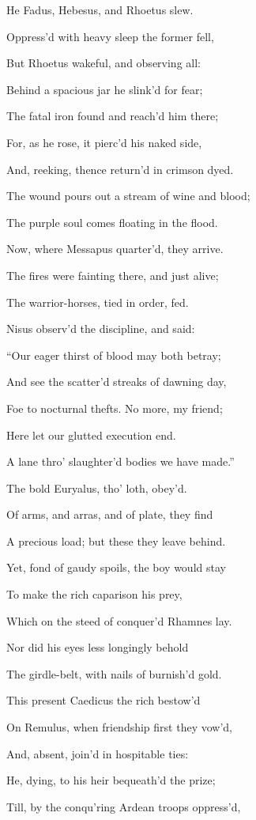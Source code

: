 He Fadus, Hebesus, and Rhoetus slew.

Oppress’d with heavy sleep the former fell,

But Rhoetus wakeful, and observing all:

Behind a spacious jar he slink’d for fear;

The fatal iron found and reach’d him there;

For, as he rose, it pierc’d his naked side,

And, reeking, thence return’d in crimson dyed.

The wound pours out a stream of wine and blood;

The purple soul comes floating in the flood.

Now, where Messapus quarter’d, they arrive.

The fires were fainting there, and just alive;

The warrior-horses, tied in order, fed.

Nisus observ’d the discipline, and said:

“Our eager thirst of blood may both betray;

And see the scatter’d streaks of dawning day,

Foe to nocturnal thefts. No more, my friend;

Here let our glutted execution end.

A lane thro’ slaughter’d bodies we have made.”

The bold Euryalus, tho’ loth, obey’d.

Of arms, and arras, and of plate, they find

A precious load; but these they leave behind.

Yet, fond of gaudy spoils, the boy would stay

To make the rich caparison his prey,

Which on the steed of conquer’d Rhamnes lay.

Nor did his eyes less longingly behold

The girdle-belt, with nails of burnish’d gold.

This present Caedicus the rich bestow’d

On Remulus, when friendship first they vow’d,

And, absent, join’d in hospitable ties:

He, dying, to his heir bequeath’d the prize;

Till, by the conqu’ring Ardean troops oppress’d,

